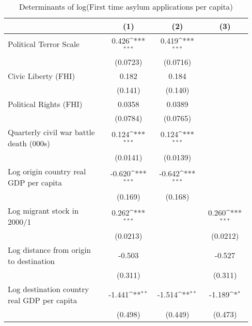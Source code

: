 \begin{table}[htbp]\centering
\def\sym#1{\ifmmode^{#1}\else\(^{#1}\)\fi}
\caption{Determinants of log(First time asylum applications per capita)}
\begin{tabular}{l*{3}{c}}
\hline\hline
                    &\multicolumn{1}{c}{(1)}         &\multicolumn{1}{c}{(2)}         &\multicolumn{1}{c}{(3)}         \\
\hline
Political Terror Scale&       0.426\sym{***}&       0.419\sym{***}&                     \\
                    &    (0.0723)         &    (0.0716)         &                     \\
[1em]
Civic Liberty (FHI) &       0.182         &       0.184         &                     \\
                    &     (0.141)         &     (0.140)         &                     \\
[1em]
Political Rights (FHI)&      0.0358         &      0.0389         &                     \\
                    &    (0.0784)         &    (0.0765)         &                     \\
[1em]
Quarterly civil war battle death (000s)&       0.124\sym{***}&       0.124\sym{***}&                     \\
                    &    (0.0141)         &    (0.0139)         &                     \\
[1em]
Log origin country real GDP per capita&      -0.620\sym{***}&      -0.642\sym{***}&                     \\
                    &     (0.169)         &     (0.168)         &                     \\
[1em]
Log migrant stock in 2000/1&       0.262\sym{***}&                     &       0.260\sym{***}\\
                    &    (0.0213)         &                     &    (0.0212)         \\
[1em]
Log distance from origin to destination&      -0.503         &                     &      -0.527         \\
                    &     (0.311)         &                     &     (0.311)         \\
[1em]
Log destination country real GDP per capita&      -1.441\sym{**} &      -1.514\sym{**} &      -1.189\sym{*}  \\
                    &     (0.498)         &     (0.449)         &     (0.473)         \\

\end{tabular}
\end{table}
